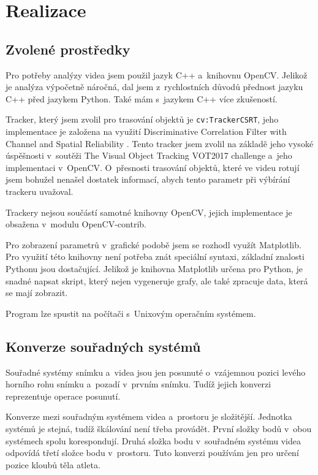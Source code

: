 \chapter{Realizace}

\section{Zvolené prostředky}
\label{sec:prostredky}

Pro potřeby analýzy videa jsem použil jazyk C++ a~knihovnu OpenCV. Jelikož je analýza výpočetně náročná, dal jsem z~rychlostních důvodů přednost jazyku C++ před jazykem Python. Také mám s~jazykem C++ více zkušeností.

Tracker, který jsem zvolil pro trasování objektů je \texttt{cv\::TrackerCSRT}, jeho implementace je založena na využití Discriminative Correlation Filter with Channel and Spatial Reliability \citep{DCFwCaSR}. Tento tracker jsem zvolil na základě jeho vysoké úspěšnosti v~soutěži The Visual Object Tracking VOT2017 challenge \citep{VOT2017} a~jeho implementaci v~OpenCV. O~přesnosti trasování objektů, které ve videu rotují jsem bohužel nenašel dostatek informací, abych tento parametr při výbírání trackeru uvažoval.

Trackery nejsou součástí samotné knihovny OpenCV, jejich implementace je obsažena v~modulu OpenCV-contrib.

Pro zobrazení parametrů v~grafické podobě jsem se rozhodl využít Matplotlib. Pro využití této knihovny není potřeba znát speciální syntaxi, základní znalosti Pythonu jsou dostačující. Jelikož je knihovna Matplotlib určena pro Python, je snadné napsat skript, který nejen vygeneruje grafy, ale také zpracuje data, která se mají zobrazit.

Program lze spustit na počítači s~Unixovým operačním systémem.




\section{Konverze souřadných systémů}
\label{sec:konverze}

Souřadné systémy snímku a~videa jsou jen posunuté o~vzájemnou pozici levého horního rohu snímku a~pozadí v~prvním snímku. Tudíž jejich konverzi reprezentuje operace posunutí.

Konverze mezi souřadným systémem videa a~prostoru je složitější. Jednotka systémů je stejná, tudíž škálování není třeba provádět. První složky bodů v~obou systémech spolu korespondují. Druhá složka bodu v~souřadném systému videa odpovídá třetí složce bodu v~prostoru. Tuto konverzi používám jen pro určení pozice kloubů těla atleta.

